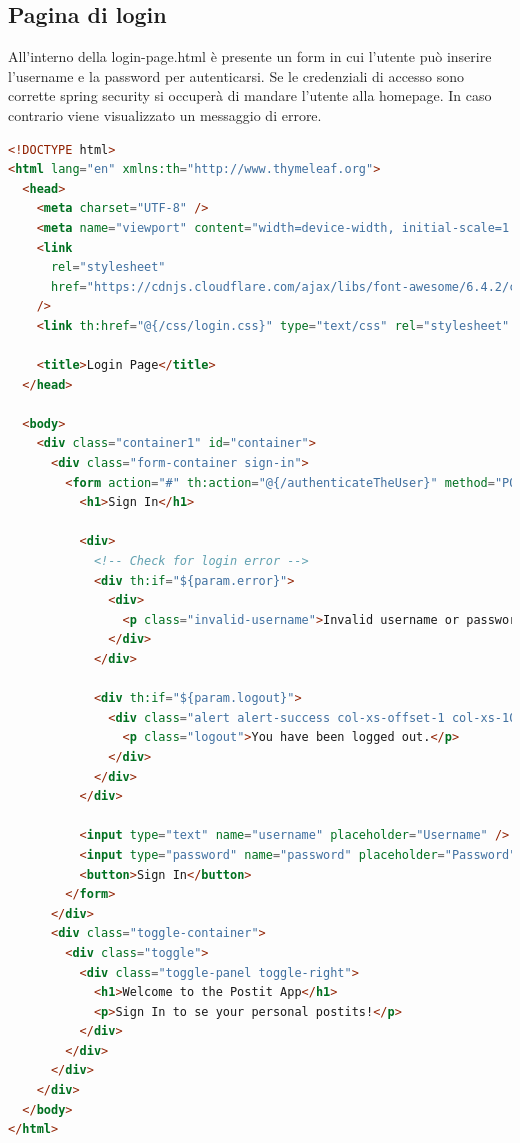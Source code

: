 \subsection{Pagina di login}
All'interno della login-page.html è presente un form in cui l'utente può inserire l'username e la password per autenticarsi.
Se le credenziali di accesso sono corrette spring security si occuperà di mandare l'utente alla homepage. In caso contrario viene visualizzato un messaggio di errore.
\begin{lstlisting}[language=html,basicstyle=\tiny, caption={login-page.html}, captionpos=b]
<!DOCTYPE html>
<html lang="en" xmlns:th="http://www.thymeleaf.org">
  <head>
    <meta charset="UTF-8" />
    <meta name="viewport" content="width=device-width, initial-scale=1.0" />
    <link
      rel="stylesheet"
      href="https://cdnjs.cloudflare.com/ajax/libs/font-awesome/6.4.2/css/all.min.css"
    />
    <link th:href="@{/css/login.css}" type="text/css" rel="stylesheet" />

    <title>Login Page</title>
  </head>

  <body>
    <div class="container1" id="container">
      <div class="form-container sign-in">
        <form action="#" th:action="@{/authenticateTheUser}" method="POST">
          <h1>Sign In</h1>

          <div>
            <!-- Check for login error -->
            <div th:if="${param.error}">
              <div>
                <p class="invalid-username">Invalid username or password.</p>
              </div>
            </div>

            <div th:if="${param.logout}">
              <div class="alert alert-success col-xs-offset-1 col-xs-10">
                <p class="logout">You have been logged out.</p>
              </div>
            </div>
          </div>

          <input type="text" name="username" placeholder="Username" />
          <input type="password" name="password" placeholder="Password" />
          <button>Sign In</button>
        </form>
      </div>
      <div class="toggle-container">
        <div class="toggle">
          <div class="toggle-panel toggle-right">
            <h1>Welcome to the Postit App</h1>
            <p>Sign In to se your personal postits!</p>
          </div>
        </div>
      </div>
    </div>
  </body>
</html>

\end{lstlisting}
\newpage
